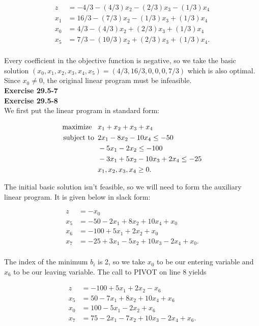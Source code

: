 \documentclass{article}
\begin{document}
\begin{align*}
z &= -4/3 - (4/3)x_2 - (2/3)x_3 - (1/3)x_4 \\
x_1 &= 16/3 - (7/3)x_2 - (1/3)x_3 + (1/3)x_4  \\
x_0 &= 4/3 - (4/3)x_2 + (2/3)x_3 + (1/3)x_4 \\
x_5 &= 7/3 - (10/3)x_2 + (2/3)x_3 + (1/3)x_4. \\
\end{align*}

Every coefficient in the objective function is negative, so we take the basic solution $(x_0,x_1,x_2,x_3,x_4,x_5) = (4/3, 16/3, 0,0,0,7/3)$ which is also optimal.  Since $x_0 \neq 0$, the original linear program must be infeasible. \\

\noindent\textbf{Exercise 29.5-7}\\

\noindent\textbf{Exercise 29.5-8}\\

We first put the linear program in standard form:

\begin{align*}
\mbox{maximize \,\,\,} & x_1 + x_2 + x_3 + x_4 \\
\mbox{subject to \,} & 2x_1 - 8x_2 - 10x_4 \leq -50 \\
& -5x_1 - 2x_2 \leq -100 \\
& -3x_1 + 5x_2 - 10x_3 + 2x_4 \leq -25\\
& x_1,x_2,x_3,x_4 \geq 0.
\end{align*}

The initial basic solution isn't feasible, so we will need to form the auxiliary linear program.  It is given below in slack form:

\begin{align*}
z &=-x_0 \\
x_5 &=-50 - 2x_1 + 8x_2 + 10x_4 + x_0  \\
x_6 &= -100 + 5x_1 + 2x_2 + x_0\\
x_7 &= -25 + 3x_1 - 5x_2 + 10x_3 - 2x_4 + x_0.\\
\end{align*}

The index of the minimum $b_i$ is 2, so we take $x_0$ to be our entering variable and $x_6$ to be our leaving variable.  The call to PIVOT on line 8 yields

\begin{align*}
z &=  -100 + 5x_1 + 2x_2 - x_6 \\
x_5 &=50 - 7x_1 + 8x_2 + 10x_4 + x_6  \\
x_0 &= 100 - 5x_1 - 2x_2 + x_6\\
x_7 &= 75 - 2x_1 - 7x_2 + 10x_3 - 2x_4 + x_6.\\
\end{align*}
\end{document}
